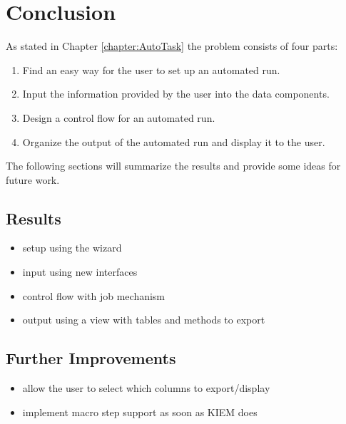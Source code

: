 \chapter{Conclusion}
\label{chapter:AutoConclusion}
As stated in Chapter \ref{chapter:AutoTask} the problem consists of four parts:
\begin{enumerate}
 \item Find an easy way for the user to set up an automated run.
 \item Input the information provided by the user into the data components.
 \item Design a control flow for an automated run.
 \item Organize the output of the automated run and display it to the user.
\end{enumerate}
The following sections will summarize the results and provide some ideas for
future work.

\section{Results}
\label{section:AutoResults}
\begin{itemize}
 \item setup using the wizard
 \item input using new interfaces
 \item control flow with job mechanism
 \item output using a view with tables and methods to export
\end{itemize}


\section{Further Improvements}
\label{section:AutoImprovements}
\begin{itemize}
 \item allow the user to select which columns to export/display
 \item implement macro step support as soon as KIEM does
\end{itemize}
